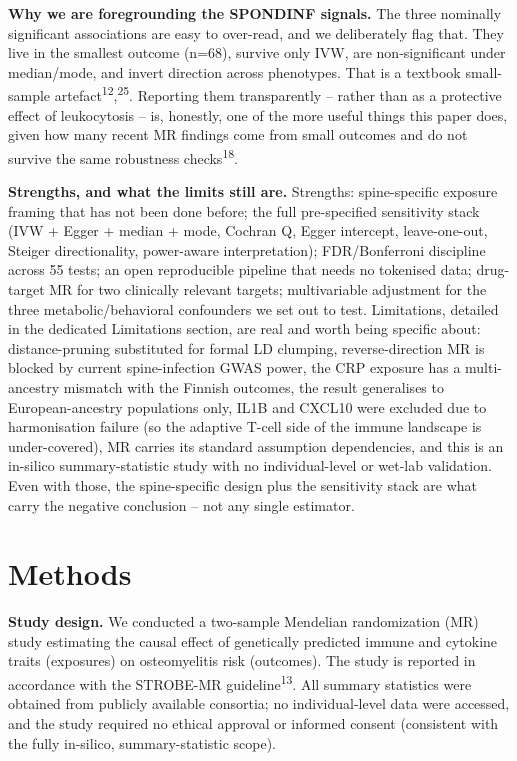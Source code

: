 \documentclass[11pt]{article}
\begin{document}
\textbf{Why we are foregrounding the SPONDINF signals.} The three nominally significant associations are easy to over-read, and we deliberately flag that. They live in the smallest outcome (n=68), survive only IVW, are non-significant under median/mode, and invert direction across phenotypes. That is a textbook small-sample artefact\textsuperscript{12},\textsuperscript{25}. Reporting them transparently -- rather than as a protective effect of leukocytosis -- is, honestly, one of the more useful things this paper does, given how many recent MR findings come from small outcomes and do not survive the same robustness checks\textsuperscript{18}.

\textbf{Strengths, and what the limits still are.} Strengths: spine-specific exposure framing that has not been done before; the full pre-specified sensitivity stack (IVW + Egger + median + mode, Cochran Q, Egger intercept, leave-one-out, Steiger directionality, power-aware interpretation); FDR/Bonferroni discipline across 55 tests; an open reproducible pipeline that needs no tokenised data; drug-target MR for two clinically relevant targets; multivariable adjustment for the three metabolic/behavioral confounders we set out to test. Limitations, detailed in the dedicated Limitations section, are real and worth being specific about: distance-pruning substituted for formal LD clumping, reverse-direction MR is blocked by current spine-infection GWAS power, the CRP exposure has a multi-ancestry mismatch with the Finnish outcomes, the result generalises to European-ancestry populations only, IL1B and CXCL10 were excluded due to harmonisation failure (so the adaptive T-cell side of the immune landscape is under-covered), MR carries its standard assumption dependencies, and this is an in-silico summary-statistic study with no individual-level or wet-lab validation. Even with those, the spine-specific design plus the sensitivity stack are what carry the negative conclusion -- not any single estimator.

\section{Methods}
\textbf{Study design.} We conducted a two-sample Mendelian randomization (MR) study estimating the causal effect of genetically predicted immune and cytokine traits (exposures) on osteomyelitis risk (outcomes). The study is reported in accordance with the STROBE-MR guideline\textsuperscript{13}. All summary statistics were obtained from publicly available consortia; no individual-level data were accessed, and the study required no ethical approval or informed consent (consistent with the fully in-silico, summary-statistic scope).
\end{document}
